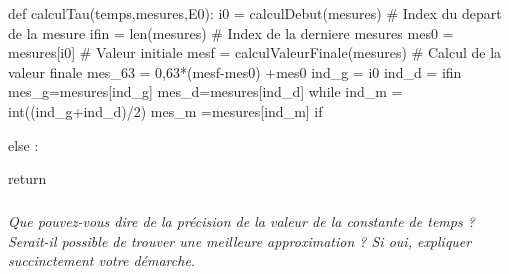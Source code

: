 \documentclass[10pt]{article}
\begin{document}
\begin{py}
\begin{minipage}[c]{.05\linewidth}
\end{minipage}\hfill
\begin{minipage}[c]{.95\linewidth}
\begin{python}
def calculTau(temps,mesures,E0):
    i0 = calculDebut(mesures)               # Index du depart de la mesure
    ifin = len(mesures)                     # Index de la derniere mesures   
    mes0 = mesures[i0]                     # Valeur initiale
    mesf = calculValeurFinale(mesures)     # Calcul de la valeur finale
    mes_63 = 0,63*(mesf-mes0) +mes0
    ind_g = i0
    ind_d = ifin
    mes_g=mesures[ind_g]
    mes_d=mesures[ind_d] 
    while 
        ind_m = int((ind_g+ind_d)/2)
        mes_m =mesures[ind_m]
        if 
            
            
        else :
            
            
    return 
\end{python}
\end{minipage}
\end{py}

%    
%
%
%    

\subparagraph{}
\textit{Que pouvez-vous dire de la précision de la valeur de la constante de temps ? Serait-il possible de trouver une meilleure approximation ?
Si oui, expliquer succinctement votre démarche.}
\end{document}
